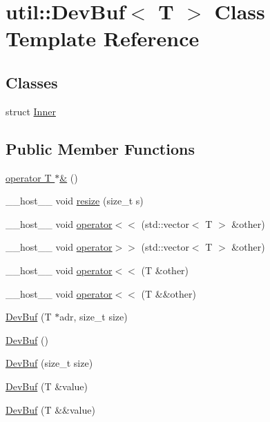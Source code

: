 \hypertarget{classutil_1_1DevBuf}{\section{util\-:\-:Dev\-Buf$<$ T $>$ Class Template Reference}
\label{classutil_1_1DevBuf}
}
\subsection*{Classes}
\begin{DoxyCompactItemize}
\item 
struct \hyperlink{structutil_1_1DevBuf_1_1Inner}{Inner}
\end{DoxyCompactItemize}
\subsection*{Public Member Functions}
\begin{DoxyCompactItemize}
\item 
\hyperlink{classutil_1_1DevBuf_af6065c6e44f96318738890a660629aba}{operator T $\ast$\&} ()
\item 
\-\_\-\-\_\-host\-\_\-\-\_\- void \hyperlink{classutil_1_1DevBuf_a32a463d0fae541627b603a4b92ebf5aa}{resize} (size\-\_\-t s)
\item 
\-\_\-\-\_\-host\-\_\-\-\_\- void \hyperlink{classutil_1_1DevBuf_a5d59088bf48ff1d70f726e7d936fbdf5}{operator$<$$<$} (std\-::vector$<$ T $>$ \&other)
\item 
\-\_\-\-\_\-host\-\_\-\-\_\- void \hyperlink{classutil_1_1DevBuf_aa23e050c8ad6879a1d416f87b9753cf8}{operator$>$$>$} (std\-::vector$<$ T $>$ \&other)
\item 
\-\_\-\-\_\-host\-\_\-\-\_\- void \hyperlink{classutil_1_1DevBuf_a2c49ae40b17a9d77e70573e4693eb833}{operator$<$$<$} (T \&other)
\item 
\-\_\-\-\_\-host\-\_\-\-\_\- void \hyperlink{classutil_1_1DevBuf_a6c12d838fcb51c93d74333dc5a252d95}{operator$<$$<$} (T \&\&other)
\item 
\hyperlink{classutil_1_1DevBuf_a0e3bb1f1e48a6b4c89e965fe1010577c}{Dev\-Buf} (T $\ast$adr, size\-\_\-t size)
\item 
\hyperlink{classutil_1_1DevBuf_ab238acdc3b2950e64b8a52714396fd7c}{Dev\-Buf} ()
\item 
\hyperlink{classutil_1_1DevBuf_abf7280b28a217b83c303f2a8d6bb32c6}{Dev\-Buf} (size\-\_\-t size)
\item 
\hyperlink{classutil_1_1DevBuf_a73af621d5394f284681cb6c3d2475d98}{Dev\-Buf} (T \&value)
\item 
\hyperlink{classutil_1_1DevBuf_a793ec131bd4cc678d0c29b269053ca2c}{Dev\-Buf} (T \&\&value)
\end{DoxyCompactItemize}
